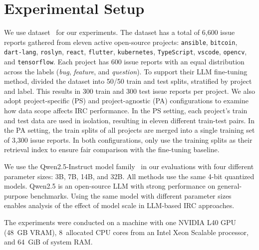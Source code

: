 \section{Experimental Setup}
\label{sec:setup}

\label{sec:setup-dataset}
We use  dataset~\cite{heo2025study} for our experiments. The dataset has a total of 6,600 issue reports gathered from eleven active open-source projects:
\texttt{ansible}, \texttt{bitcoin},
\texttt{dart-lang}, \texttt{roslyn},
\texttt{react}, \texttt{flutter},
\texttt{kubernetes}, \texttt{TypeScript},
\texttt{vscode}, \texttt{opencv}, and
\texttt{tensorflow}. Each project has 600 issue reports
with an equal distribution across the labels
(\emph{bug}, \emph{feature}, and \emph{question}). To support their LLM fine-tuning method,  divided the dataset into 50/50 train and test
splits, stratified by project and label. This results in 300 train
and 300 test issue reports per project. We also adopt  project-specific (PS) and project-agnostic (PA) configurations to examine how data scope affects IRC performance. In the PS setting, each project's train and test data are used in isolation, resulting in eleven different train-test pairs. In the PA setting, the train splits of all projects are merged into a single training set of 3,300 issue reports. In both configurations,  only use the training splits as their retrieval index to ensure fair comparison with the fine-tuning baseline.

\label{sec:setup-models}
We use the Qwen2.5-Instruct model family~\cite{yang2024qwen25} in our evaluations with four different parameter sizes: 3B, 7B, 14B, and 32B. All  methods use the same 4-bit quantized models. Qwen2.5 is an open-source LLM with strong performance on general-purpose benchmarks. Using the same model with different parameter sizes enables analysis of the effect of model scale in LLM-based IRC approaches.


\label{sec:setup-metrics}

\label{sec:setup-hardware}
The experiments were conducted on a machine with one NVIDIA L40 GPU (48~GB VRAM), 8~allocated CPU cores from an Intel Xeon Scalable processor, and 64~GiB of system RAM.
